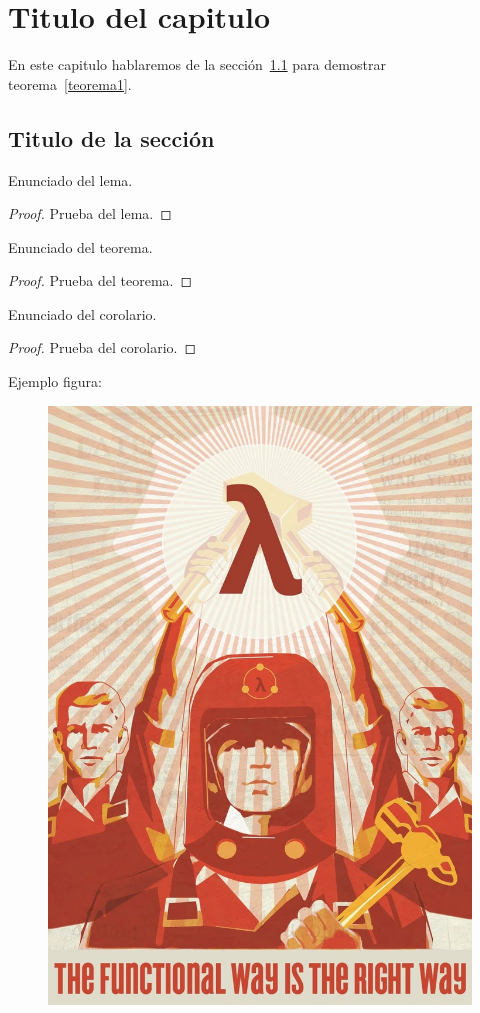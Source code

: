 \chapter{Titulo del capitulo}\label{cap1}

En este capitulo hablaremos de la sección~\ref{cap1:sec1} para demostrar teorema~\ref{teorema1}. 

\section{Titulo de la sección}\label{cap1:sec1}

\begin{lemma}\label{lema1}
    Enunciado del lema.
\end{lemma}

\begin{proof}
    Prueba del lema.
\end{proof}

\begin{theorem}\label{teorema1}
    Enunciado del teorema.
\end{theorem}

\begin{proof}
    Prueba del teorema.
\end{proof}

\begin{corollary}\label{corolario1}
    Enunciado del corolario.
\end{corollary}

\begin{proof}
    Prueba del corolario.
\end{proof}

Ejemplo figura:

\begin{figure}[h] 
  \centering
  \includegraphics[width=1\textwidth]{Imgs/FunctionalWay.jpg}
\end{figure}
